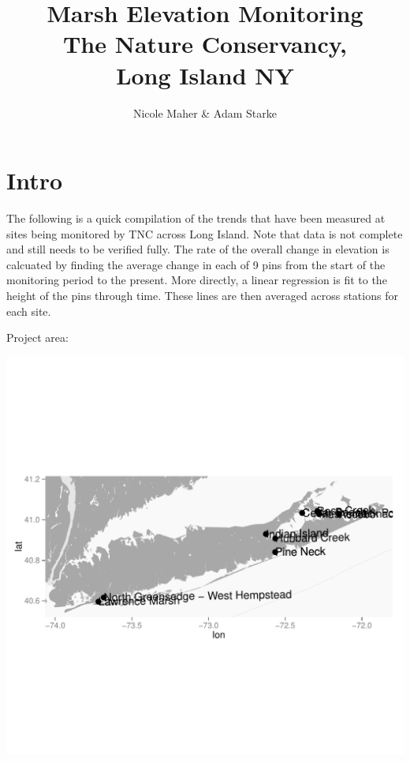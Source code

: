 \documentclass{article}\usepackage[]{graphicx}\usepackage[]{color}
\makeatletter
\def\maxwidth{ %
  \ifdim\Gin@nat@width>\linewidth
    \linewidth
  \else
    \Gin@nat@width
  \fi
}
\makeatother
\begin{document}
\title{Marsh Elevation Monitoring\\
The Nature Conservancy, \\
Long Island NY}
\author{Nicole Maher \& Adam Starke}
\maketitle\thispagestyle{empty}





\section{Intro}
The following is a quick compilation of the trends that have been measured at sites being monitored by TNC across Long Island. Note that data is not complete and still needs to be verified fully. The rate of the overall change in elevation is calcuated by finding the average change in each of 9 pins from the start of the monitoring period to the present. More directly, a linear regression is fit to the height of the pins through time. These lines are then averaged across stations for each site. 

Project area:


{\centering \includegraphics[width=\maxwidth]{figure/Maps} 

}
\end{document}
